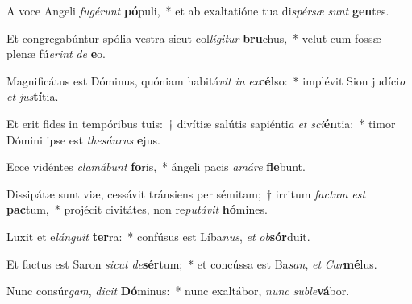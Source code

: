 \item A voce Angeli \textit{fu}\textit{gé}\textit{runt} \textbf{pó}puli,~* et ab exaltatióne tua di\textit{spér}\textit{sæ} \textit{sunt} \textbf{gen}tes.
\item Et congregabúntur spólia vestra sicut col\textit{lí}\textit{gi}\textit{tur} \textbf{bru}chus,~* velut cum fossæ plenæ fú\textit{e}\textit{rint} \textit{de} \textbf{e}o.
\item Magnificátus est Dóminus, quóniam habitá\textit{vit} \textit{in} \textit{ex}\textbf{cél}so:~* implévit Sion judíci\textit{o} \textit{et} \textit{jus}\textbf{tí}tia.
\item Et erit fides in tempóribus tuis:~† divítiæ salútis sapiénti\textit{a} \textit{et} \textit{sci}\textbf{én}tia:~* timor Dómini ipse est \textit{the}\textit{sáu}\textit{rus} \textbf{e}jus.
\item Ecce vidéntes \textit{cla}\textit{má}\textit{bunt} \textbf{fo}ris,~* ángeli pacis \textit{a}\textit{má}\textit{re} \textbf{fle}bunt.
\item Dissipátæ sunt viæ, cessávit tránsiens per sémitam;~† irritum \textit{fac}\textit{tum} \textit{est} \textbf{pac}tum,~* projécit civitátes, non re\textit{pu}\textit{tá}\textit{vit} \textbf{hó}mines.
\item Luxit et e\textit{lán}\textit{gu}\textit{it} \textbf{ter}ra:~* confúsus est Líba\textit{nus}, \textit{et} \textit{ob}\textbf{sór}duit.
\item Et factus est Saron \textit{sic}\textit{ut} \textit{de}\textbf{sér}tum;~* et concússa est Ba\textit{san}, \textit{et} \textit{Car}\textbf{mé}lus.
\item Nunc consúr\textit{gam}, \textit{di}\textit{cit} \textbf{Dó}minus:~* nunc exaltábor, \textit{nunc} \textit{sub}\textit{le}\textbf{vá}bor.
